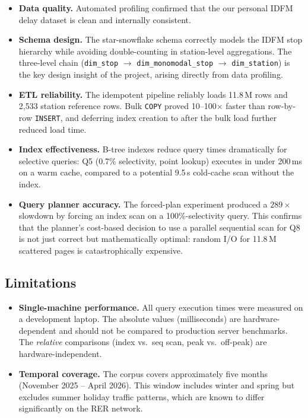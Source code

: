 \documentclass[a4paper,11pt]{article}
\begin{document}
\begin{itemize}
  \item \textbf{Data quality.}
    Automated profiling confirmed that the our personal IDFM delay dataset is clean and
    internally consistent.

  \item \textbf{Schema design.}
    The star-snowflake schema correctly models the IDFM stop hierarchy while
    avoiding double-counting in station-level aggregations.
    The three-level chain (\texttt{dim\_stop} $\to$ \texttt{dim\_monomodal\_stop}
    $\to$ \texttt{dim\_station}) is the key design insight of the project, arising
    directly from data profiling.

  \item \textbf{ETL reliability.}
    The idempotent pipeline reliably loads 11.8\,M rows and 2,533 station
    reference rows.
    Bulk \texttt{COPY} proved 10--100$\times$ faster than row-by-row \texttt{INSERT},
    and deferring index creation to after the bulk load further reduced load time.

  \item \textbf{Index effectiveness.}
    B-tree indexes reduce query times dramatically for selective queries:
    Q5 (0.7\% selectivity, point lookup) executes in under 200\,ms on a warm cache,
    compared to a potential 9.5\,s cold-cache scan without the index.

  \item \textbf{Query planner accuracy.}
    The forced-plan experiment produced a $289\times$ slowdown by forcing an index
    scan on a 100\%-selectivity query.
    This confirms that the planner's cost-based decision to use a parallel
    sequential scan for Q8 is not just correct but mathematically optimal: random
    I/O for 11.8\,M scattered pages is catastrophically expensive.

\end{itemize}

\subsection{Limitations}

\begin{itemize}

  \item \textbf{Single-machine performance.}
    All query execution times were measured on a development laptop.
    The absolute values (milliseconds) are hardware-dependent and should not be
    compared to production server benchmarks.
    The \emph{relative} comparisons (index vs.\ seq scan, peak vs.\ off-peak) are
    hardware-independent.

  \item \textbf{Temporal coverage.}
    The corpus covers approximately five months (November 2025 -- April 2026).
    This window includes winter and spring but excludes summer holiday traffic
    patterns, which are known to differ significantly on the RER network.
\end{itemize}
\end{document}

